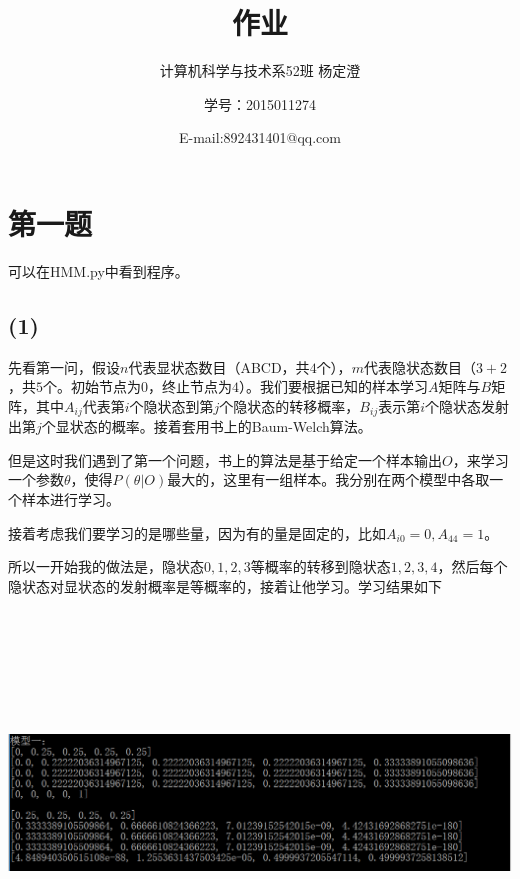 \documentclass{ctexart}
\begin{document}
\title{作业}
\author{计算机科学与技术系52班 杨定澄 \and 学号：2015011274 \and E-mail:892431401@qq.com}
\date{}
\maketitle
\section{第一题}
可以在HMM.py中看到程序。

\subsection*{(1)}

先看第一问，假设$n$代表显状态数目（ABCD，共$4$个），$m$代表隐状态数目（$3+2$，共$5$个。初始节点为$0$，终止节点为$4$）。我们要根据已知的样本学习$A$矩阵与$B$矩阵，其中$A_{ij}$代表第$i$个隐状态到第$j$个隐状态的转移概率，$B_{ij}$表示第$i$个隐状态发射出第$j$个显状态的概率。接着套用书上的Baum-Welch算法。

但是这时我们遇到了第一个问题，书上的算法是基于给定一个样本输出$O$，来学习一个参数$\theta$，使得$P(\theta|O)$最大的，这里有一组样本。我分别在两个模型中各取一个样本进行学习。

接着考虑我们要学习的是哪些量，因为有的量是固定的，比如$A_{i0}=0,A_{44}=1$。

所以一开始我的做法是，隐状态$0,1,2,3$等概率的转移到隐状态$1,2,3,4$，然后每个隐状态对显状态的发射概率是等概率的，接着让他学习。学习结果如下

\includegraphics[width=6in,height=4in]{1.png}
\end{document}

